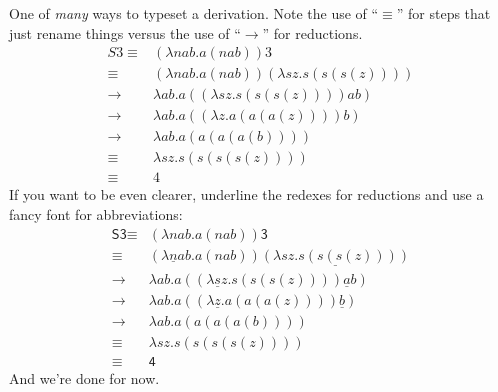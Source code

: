 \documentclass[a4paper,12pt]{article}
\begin{document}
One of \emph{many} ways to typeset a derivation.
Note the use of ``\(\equiv\)'' for steps that just rename things versus the use
of ``\(\to\)'' for reductions.
%
\begin{align*}
S3
\equiv {} & (\lambda nab.a(nab)) 3 \\
\equiv {} & (\lambda nab.a(nab)) (\lambda sz.s(s(s(z)))) \\
\to {}    & \lambda ab.a((\lambda sz.s(s(s(z))))ab) \\
\to {}    & \lambda ab.a((\lambda z.a(a(a(z))))b) \\
\to {}    & \lambda ab.a(a(a(a(b)))) \\
\equiv {} & \lambda sz.s(s(s(s(z)))) \\
\equiv {} & 4
\end{align*}
%
If you want to be even clearer, underline the redexes for reductions and use a
fancy font for abbreviations:
%
\begin{align*}
\textsf{S3}
\equiv {} & (\lambda nab.a(nab)) \textsf{3} \\
\equiv {} & (\lambda \underline{n}ab.a(nab)) \underline{(\lambda sz.s(s(s(z))))} \\
\to {}    & \lambda ab.a((\lambda \underline{s}z.s(s(s(z))))\underline{a}b) \\
\to {}    & \lambda ab.a((\lambda \underline{z}.a(a(a(z))))\underline{b}) \\
\to {}    & \lambda ab.a(a(a(a(b)))) \\
\equiv {} & \lambda sz.s(s(s(s(z)))) \\
\equiv {} & \textsf{4}
\end{align*}
%
And we're done for now.
\end{document}
